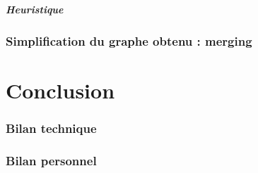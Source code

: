 \documentclass[a4paper,12pt]{report}
\begin{document}
\paragraph{Heuristique}

\subsection{Simplification du graphe obtenu : merging}

\chapter{Conclusion}

\subsection*{Bilan technique}


\subsection*{Bilan personnel}
\end{document}
